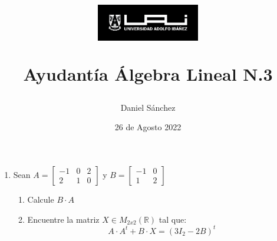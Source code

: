 \documentclass[12pt]{article}
\begin{document}
\title{
    \begin{figure}[ht]
        \centering
        \includegraphics[width = 0.4\textwidth, ]{../../logo-uai.jpg}\\
    \end{figure}
    Ayudant\'ia \'Algebra Lineal N.3}
\date{26 de Agosto 2022}
\author{Daniel S\'anchez}
\maketitle

\begin{enumerate}
    \item Sean $A= \begin{bmatrix}
                  -1 & 0 & 2 \\
                  2  & 1 & 0
              \end{bmatrix}$ y $B=\begin{bmatrix}
                  -1 & 0 \\
                  1  & 2
              \end{bmatrix}$
          \begin{enumerate}
              \item Calcule $B\cdot A$
              \item Encuentre la matriz $X \in M_{2x2}(\mathbb{R})$ tal que:
                    $$A\cdot A^t+B\cdot X=(3I_2-2B)^t$$
          \end{enumerate}
          
          

\end{enumerate}
\end{document}
